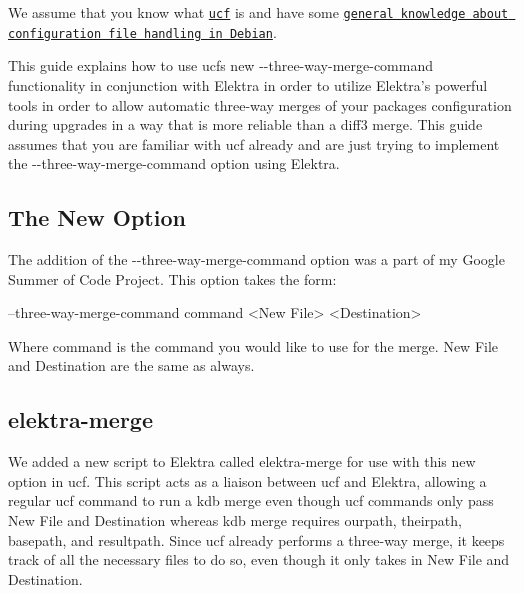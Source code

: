 We assume that you know what \href{https://packages.debian.org/sid/ucf}{\tt ucf} is and have some \href{https://wiki.debian.org/ConfigPackages}{\tt general knowledge about configuration file handling in Debian}.

This guide explains how to use ucf\textquotesingle{}s new {\ttfamily -\/-\/three-\/way-\/merge-\/command} functionality in conjunction with Elektra in order to utilize Elektra’s powerful tools in order to allow automatic three-\/way merges of your package\textquotesingle{}s configuration during upgrades in a way that is more reliable than a diff3 merge. This guide assumes that you are familiar with ucf already and are just trying to implement the {\ttfamily -\/-\/three-\/way-\/merge-\/command} option using Elektra.

\subsection*{The New Option}

The addition of the {\ttfamily -\/-\/three-\/way-\/merge-\/command} option was a part of my Google Summer of Code Project. This option takes the form\+: \begin{DoxyVerb}--three-way-merge-command command <New File> <Destination>
\end{DoxyVerb}


Where {\ttfamily command} is the command you would like to use for the merge. {\ttfamily New File} and {\ttfamily Destination} are the same as always.

\subsection*{elektra-\/merge}

We added a new script to Elektra called elektra-\/merge for use with this new option in ucf. This script acts as a liaison between ucf and Elektra, allowing a regular ucf command to run a {\ttfamily kdb merge} even though ucf commands only pass {\ttfamily New File} and {\ttfamily Destination} whereas kdb merge requires {\ttfamily ourpath}, {\ttfamily theirpath}, {\ttfamily basepath}, and {\ttfamily resultpath}. Since ucf already performs a three-\/way merge, it keeps track of all the necessary files to do so, even though it only takes in {\ttfamily New File} and {\ttfamily Destination}.

